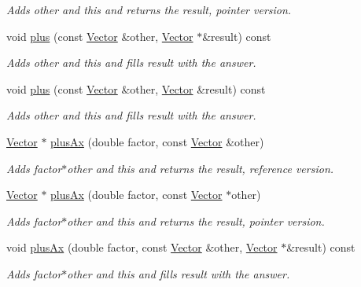 \begin{DoxyCompactItemize}
\begin{DoxyCompactList}\small\item\em Adds other and this and returns the result, pointer version. \end{DoxyCompactList}\item 
void \hyperlink{class_c_a_r_o_m_1_1_vector_a5e3c7bfdc3def80e6966a1a0182c133c}{plus} (const \hyperlink{class_c_a_r_o_m_1_1_vector}{Vector} \&other, \hyperlink{class_c_a_r_o_m_1_1_vector}{Vector} $\ast$\&result) const 
\begin{DoxyCompactList}\small\item\em Adds other and this and fills result with the answer. \end{DoxyCompactList}\item 
void \hyperlink{class_c_a_r_o_m_1_1_vector_a83aac7d7d04c513e3c42f304fbd1cc62}{plus} (const \hyperlink{class_c_a_r_o_m_1_1_vector}{Vector} \&other, \hyperlink{class_c_a_r_o_m_1_1_vector}{Vector} \&result) const 
\begin{DoxyCompactList}\small\item\em Adds other and this and fills result with the answer. \end{DoxyCompactList}\item 
\hyperlink{class_c_a_r_o_m_1_1_vector}{Vector} $\ast$ \hyperlink{class_c_a_r_o_m_1_1_vector_ace7a3b2cc2fb52c71f294d80cb8de222}{plus\-Ax} (double factor, const \hyperlink{class_c_a_r_o_m_1_1_vector}{Vector} \&other)
\begin{DoxyCompactList}\small\item\em Adds factor$\ast$other and this and returns the result, reference version. \end{DoxyCompactList}\item 
\hyperlink{class_c_a_r_o_m_1_1_vector}{Vector} $\ast$ \hyperlink{class_c_a_r_o_m_1_1_vector_a47bb52d90d711ed3b7991dc211bd3a80}{plus\-Ax} (double factor, const \hyperlink{class_c_a_r_o_m_1_1_vector}{Vector} $\ast$other)
\begin{DoxyCompactList}\small\item\em Adds factor$\ast$other and this and returns the result, pointer version. \end{DoxyCompactList}\item 
void \hyperlink{class_c_a_r_o_m_1_1_vector_a53957f0897e84f685ff91891b5f5ebb4}{plus\-Ax} (double factor, const \hyperlink{class_c_a_r_o_m_1_1_vector}{Vector} \&other, \hyperlink{class_c_a_r_o_m_1_1_vector}{Vector} $\ast$\&result) const 
\begin{DoxyCompactList}\small\item\em Adds factor$\ast$other and this and fills result with the answer. \end{DoxyCompactList}\item 

\end{DoxyCompactItemize}
